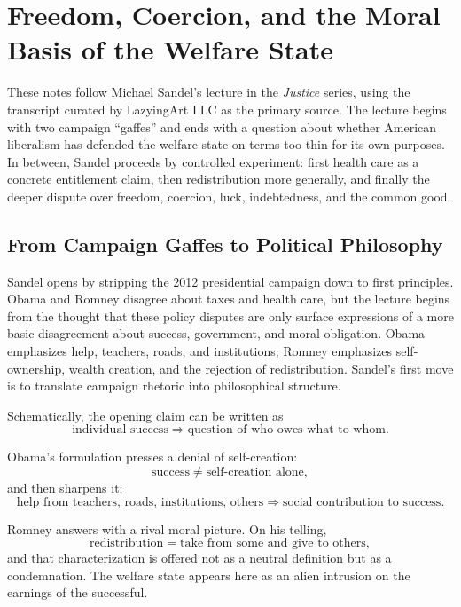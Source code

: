 \chapter{Freedom, Coercion, and the Moral Basis of the Welfare State}

These notes follow Michael Sandel's lecture in the \emph{Justice} series, using the transcript curated by LazyingArt LLC as the primary source. The lecture begins with two campaign ``gaffes'' and ends with a question about whether American liberalism has defended the welfare state on terms too thin for its own purposes. In between, Sandel proceeds by controlled experiment: first health care as a concrete entitlement claim, then redistribution more generally, and finally the deeper dispute over freedom, coercion, luck, indebtedness, and the common good.

\section{From Campaign Gaffes to Political Philosophy}

Sandel opens by stripping the 2012 presidential campaign down to first principles. Obama and Romney disagree about taxes and health care, but the lecture begins from the thought that these policy disputes are only surface expressions of a more basic disagreement about success, government, and moral obligation. Obama emphasizes help, teachers, roads, and institutions; Romney emphasizes self-ownership, wealth creation, and the rejection of redistribution. Sandel's first move is to translate campaign rhetoric into philosophical structure.

Schematically, the opening claim can be written as
\begin{equation}
\text{individual success}
\Longrightarrow
\text{question of who owes what to whom}.
\end{equation}

Obama's formulation presses a denial of self-creation:
\begin{equation}
\text{success}
\neq
\text{self-creation alone},
\end{equation}
and then sharpens it:
\begin{equation}
\text{help from teachers, roads, institutions, others}
\Longrightarrow
\text{social contribution to success}.
\end{equation}

Romney answers with a rival moral picture. On his telling,
\begin{equation}
\text{redistribution}
=
\text{take from some and give to others},
\end{equation}
and that characterization is offered not as a neutral definition but as a condemnation. The welfare state appears here as an alien intrusion on the earnings of the successful.


